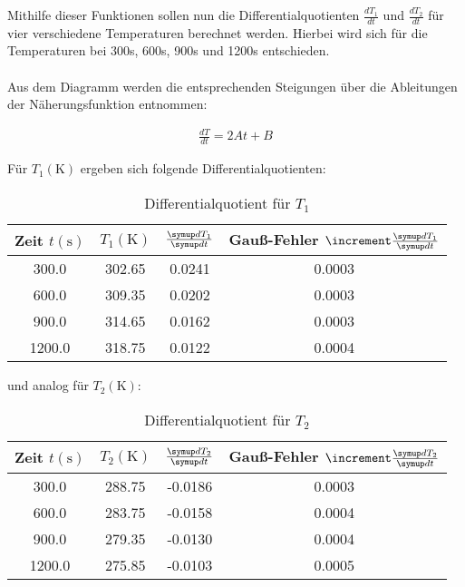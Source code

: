 Mithilfe dieser Funktionen sollen nun die Differentialquotienten $\frac{dT_{1}}{dt}$ und $\frac{dT_{2}}{dt}$ 
für vier verschiedene Temperaturen berechnet werden. Hierbei wird sich für die Temperaturen bei 
300s, 600s, 900s und 1200s entschieden. 
\\\\
Aus dem Diagramm werden die entsprechenden Steigungen über die Ableitungen der Näherungsfunktion entnommen:

\begin{align*} 
  \frac{dT}{dt} = 2At + B 
\end{align*}

Für $T_{1} (\unit{\kelvin})$ ergeben sich folgende Differentialquotienten:

\begin{table}
  \centering
  \caption{Differentialquotient für $T_{1}$}
  \label{tab:berechnete_werte_T1}
  \begin{tabular}{c c c c}
    \toprule
    {Zeit $t (\unit{\second})$} &
    {$T_{1} (\unit{\kelvin})$} &
    {$\frac{\dif{T_{1}}} {\dif{t}}$} & 
    {Gauß-Fehler $\increment \frac{\dif{T_{1}}} {\dif{t}}$}\\
    \midrule
     300.0 & 302.65 &  0.0241 &   0.0003 \\
     600.0 & 309.35 &  0.0202 &   0.0003 \\
     900.0 & 314.65 &  0.0162 &   0.0003 \\
    1200.0 & 318.75 &  0.0122 &   0.0004 \\
    \bottomrule
  \end{tabular}
\end{table}

und analog für $T_{2} (\unit{\kelvin})$:

\begin{table}
  \centering
  \caption{Differentialquotient für $T_{2}$}
  \label{tab:berechnete_werte_T2}
  \begin{tabular}{c c c c}
    \toprule
    {Zeit $t (\unit{\second})$} &
    {$T_{2} (\unit{\kelvin})$} &
    {$\frac{\dif{T_{2}}}{\dif{t}}$} &
    {Gauß-Fehler $\increment \frac{\dif{T_{2}}} {\dif{t}}$} \\
    \midrule
     300.0 & 288.75 & -0.0186 &   0.0003 \\
     600.0 & 283.75 & -0.0158 &   0.0004 \\
     900.0 & 279.35 & -0.0130 &   0.0004 \\
    1200.0 & 275.85 & -0.0103 &   0.0005 \\
    \bottomrule
  \end{tabular}
\end{table}

